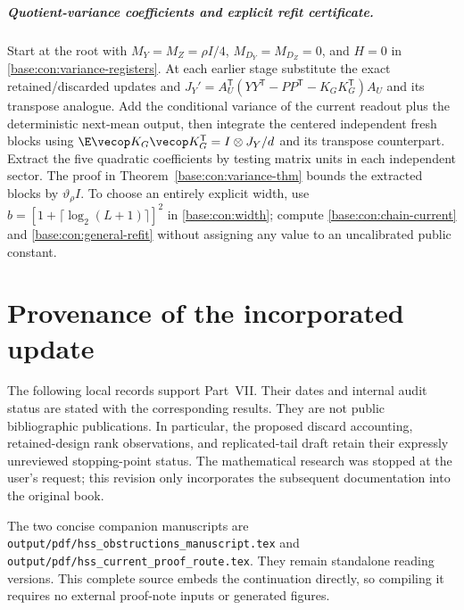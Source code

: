\documentclass[11pt,oneside,openany,a4paper]{book}
\numberwithin{equation}{chapter}
\theoremstyle{definition}
\theoremstyle{remark}
\newcommand{\T}{\mathsf T}\newcommand{\Id}{I}
\newcommand{\sourcefile}[1]{{\small\nolinkurl{#1}}}
\begin{document}
\paragraph{Quotient-variance coefficients and explicit refit certificate.}
Start at the root with $M_Y=M_Z=\rho I/4$, $M_{D_Y}=M_{D_Z}=0$, and $H=0$ in \eqref{base:con:variance-registers}. At each earlier stage substitute the exact retained/discarded updates and $J_Y'=A_U^\T(YY^\T-PP^\T-K_GK_G^\T)A_U$ and its transpose analogue. Add the conditional variance of the current readout plus the deterministic next-mean output, then integrate the centered independent fresh blocks using $\E\vecop K_G\vecop K_G^\T=I\otimes J_Y/d$ and its transpose counterpart. Extract the five quadratic coefficients by testing matrix units in each independent sector. The proof in Theorem~\ref{base:con:variance-thm} bounds the extracted blocks by $\vartheta_\rho I$. To choose an entirely explicit width, use $b=[1+\lceil\log_2(L+1)\rceil]^2$ in \eqref{base:con:width}; compute \eqref{base:con:chain-current} and \eqref{base:con:general-refit} without assigning any value to an uncalibrated public constant.

\clearpage

\endgroup


\chapter{Provenance of the incorporated update}
\label{upd:appendix:sources}
The following local records support Part~VII. Their dates and internal
audit status are stated with the corresponding results. They are not
public bibliographic publications. In particular, the proposed discard
accounting, retained-design rank observations, and replicated-tail draft
retain their expressly unreviewed stopping-point status. The mathematical
research was stopped at the user's request; this revision only incorporates
the subsequent documentation into the original book.

The two concise companion manuscripts are
\sourcefile{output/pdf/hss_obstructions_manuscript.tex} and
\sourcefile{output/pdf/hss_current_proof_route.tex}. They remain standalone
reading versions. This complete source embeds the continuation directly,
so compiling it requires no external proof-note inputs or generated figures.
\end{document}
